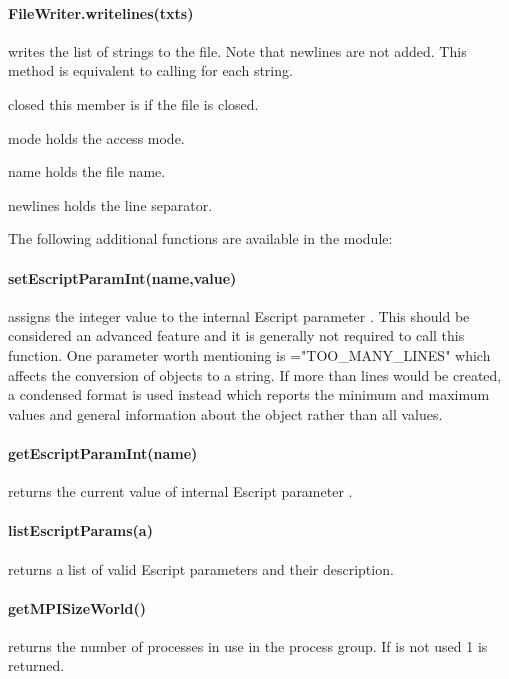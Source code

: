 \paragraph{FileWriter.writelines(txts)}
writes the list  of strings to the file.
Note that newlines are not added.
This method is equivalent to calling  for each string.

\begin{memberdesc}[FileWriter]{closed}
this member is \True if the file is closed.
\end{memberdesc}
\begin{memberdesc}[FileWriter]{mode}
holds the access mode.
\end{memberdesc}
\begin{memberdesc}[FileWriter]{name}
holds the file name.
\end{memberdesc}
\begin{memberdesc}[FileWriter]{newlines}
holds the line separator.
\end{memberdesc}

\noindent The following additional functions are available in the \escript
module:
\paragraph{setEscriptParamInt(name,value)}
assigns the integer value  to the internal Escript parameter
. This should be considered an advanced feature and it is generally
not required to call this function. One parameter worth mentioning is
="TOO_MANY_LINES" which affects the conversion of \Data objects to a
string. If more than  lines would be created, a condensed format is
used instead which reports the minimum and maximum values and general
information about the \Data object rather than all values.


\paragraph{getEscriptParamInt(name)}
returns the current value of internal Escript parameter .


\paragraph{listEscriptParams(a)}
returns a list of valid Escript parameters and their description.


\paragraph{getMPISizeWorld()}
returns the number of \MPI processes in use in the 
process group. If \MPI is not used 1 is returned.


